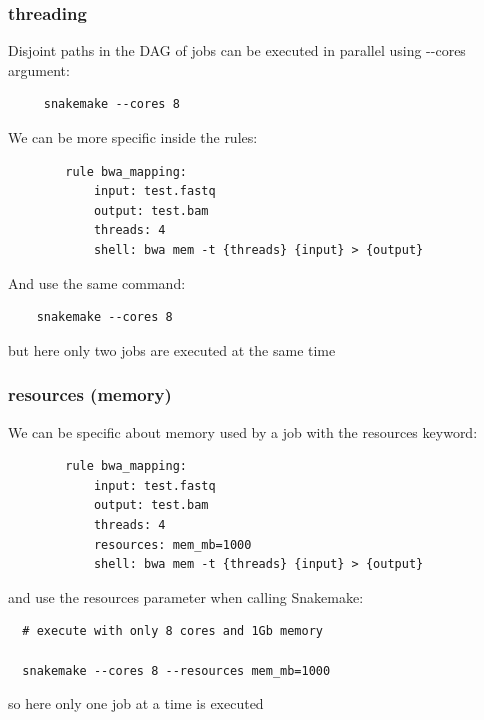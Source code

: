\documentclass{beamer}
\begin{document}



\begin{frame}[fragile]
\frametitle{threading}
Disjoint paths in the DAG of jobs can be executed in parallel using -\--cores 
argument:
\begin{lstlisting}
     snakemake --cores 8
\end{lstlisting}
We can be more specific inside the rules:
\begin{lstlisting}
        rule bwa_mapping:
            input: test.fastq
            output: test.bam
            threads: 4 
            shell: bwa mem -t {threads} {input} > {output}
\end{lstlisting}
 And use the same command:
 \begin{lstlisting}
    snakemake --cores 8
 \end{lstlisting}
 but here only two jobs are executed at the same time
\end{frame}
 
 
\begin{frame}[fragile]
\frametitle{resources (memory)}
We can be specific about memory used by a job with the resources keyword:
\begin{lstlisting}
        rule bwa_mapping:
            input: test.fastq
            output: test.bam
            threads: 4 
            resources: mem_mb=1000
            shell: bwa mem -t {threads} {input} > {output}
 \end{lstlisting}
  
and use the resources parameter when calling Snakemake:  
  \begin{lstlisting}
  # execute with only 8 cores and 1Gb memory
  
  snakemake --cores 8 --resources mem_mb=1000
  \end{lstlisting}   
  
  so here only one job at a time is executed
  
\end{frame}
 
\end{document}
